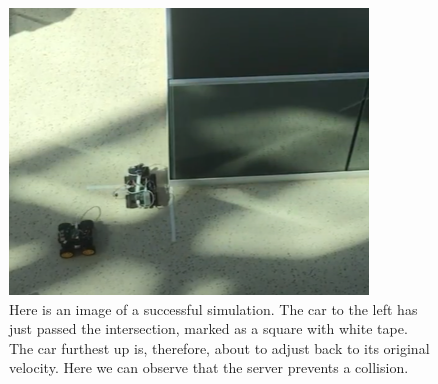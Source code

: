 \begin{figure}[h!]
	\centering
	\includegraphics[width=0.9\linewidth]{figures/succsess_demo}
	\caption[Successful demo]{Here is an image of a successful simulation. The car to the left has just passed the intersection, marked as a square with white tape. The car furthest up is, therefore, about to adjust back to its original velocity. Here we can observe that the server prevents a collision.}
	\label{fig:successdemo}
\end{figure}